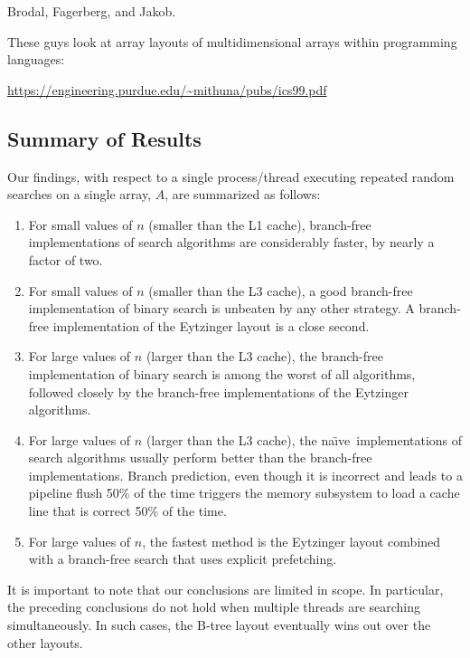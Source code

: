 \documentclass{patmorin}
\newcommand{\naive}{na\"{\i}ve}
\begin{document}
Brodal, Fagerberg, and Jakob.


These guys look at array layouts of multidimensional arrays within programming languages:

\url{https://engineering.purdue.edu/~mithuna/pubs/ics99.pdf}


\subsection{Summary of Results}

Our findings, with respect to a single process/thread executing repeated random
searches on a single array, $A$, are summarized as follows:

\begin{enumerate}
  \item For small values of $n$ (smaller than the L1 cache), branch-free
    implementations of search algorithms are considerably faster, by nearly
    a factor of two.
  
  \item For small values of $n$ (smaller than the L3 cache), a good
    branch-free implementation of binary search is unbeaten by any other
    strategy.  A branch-free implementation of the Eytzinger layout is a
    close second.
  
  \item For large values of $n$ (larger than the L3 cache), the branch-free
    implementation of binary search is among the worst of all algorithms,
    followed closely by the branch-free implementations of the Eytzinger
    algorithms.
  
  \item For large values of $n$ (larger than the L3 cache), the \naive\
    implementations of search algorithms usually perform better than the
    branch-free implementations.  Branch prediction, even though it is
    incorrect and leads to a pipeline flush 50\% of the time triggers
    the memory subsystem to load a cache line that is correct 50\%
    of the time.  

  \item For large values of $n$, the fastest method is the Eytzinger layout
   combined with a branch-free search that uses explicit prefetching.
\end{enumerate}

It is important to note that our conclusions are limited in scope. In
particular, the preceding conclusions do not hold when multiple threads
are searching simultaneously.  In such cases, the B-tree layout eventually
wins out over the other layouts.
\end{document}
